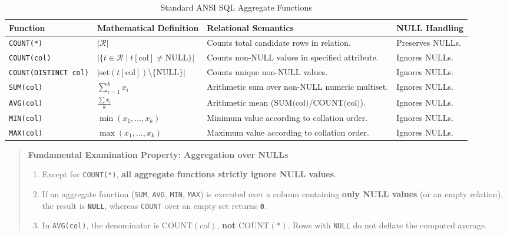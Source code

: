 \begin{table}[htbp]
\centering
\small
\caption{Standard ANSI SQL Aggregate Functions}
\label{tab:sql_aggregates}
\begin{tabularx}{\textwidth}{l p{2.8cm} X l}
\toprule
\textbf{Function} & \textbf{Mathematical Definition} & \textbf{Relational Semantics} & \textbf{NULL Handling} \\
\midrule
\texttt{COUNT(*)} & $|\mathcal{R}|$ & Counts total candidate rows in relation. & Preserves NULLs. \\
\texttt{COUNT(col)} & $|\{t \in \mathcal{R} \mid t[\text{col}] \neq \text{NULL}\}|$ & Counts non-NULL values in specified attribute. & Ignores NULLs. \\
\texttt{COUNT(DISTINCT col)} & $|\text{set}(t[\text{col}]) \setminus \{\text{NULL}\}|$ & Counts unique non-NULL values. & Ignores NULLs. \\
\texttt{SUM(col)} & $\sum_{i=1}^{k} x_i$ & Arithmetic sum over non-NULL numeric multiset. & Ignores NULLs. \\
\texttt{AVG(col)} & $\frac{\sum x_i}{k}$ & Arithmetic mean ($\text{SUM(col)} / \text{COUNT(col)}$). & Ignores NULLs. \\
\texttt{MIN(col)} & $\min(x_1, \dots, x_k)$ & Minimum value according to collation order. & Ignores NULLs. \\
\texttt{MAX(col)} & $\max(x_1, \dots, x_k)$ & Maximum value according to collation order. & Ignores NULLs. \\
\bottomrule
\end{tabularx}
\end{table}

\begin{quote}
\textbf{Fundamental Examination Property: Aggregation over NULLs}
\begin{enumerate}
    \item Except for \texttt{COUNT(*)}, \textbf{all aggregate functions strictly ignore NULL values}.
    \item If an aggregate function (\texttt{SUM}, \texttt{AVG}, \texttt{MIN}, \texttt{MAX}) is executed over a column containing \textbf{only NULL values} (or an empty relation), the result is \textbf{\texttt{NULL}}, whereas \texttt{COUNT} over an empty set returns \textbf{\texttt{0}}.
    \item In \texttt{AVG(col)}, the denominator is $\text{COUNT}(col)$, \textbf{not} $\text{COUNT}(*)$. Rows with \texttt{NULL} do not deflate the computed average.
\end{enumerate}
\end{quote}

